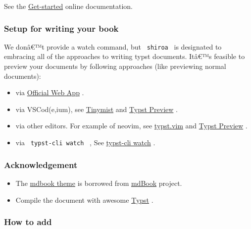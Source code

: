 See the
\href{https://myriad-dreamin.github.io/shiroa/guide/get-started.html}{Get-started}
online documentation.

\subsubsection{Setup for writing your
book}\label{setup-for-writing-your-book}

We donâ€™t provide a watch command, but \texttt{\ shiroa\ } is
designated to embracing all of the approaches to writing typst
documents. Itâ€™s feasible to preview your documents by following
approaches (like previewing normal documents):

\begin{itemize}
\item
  via \href{https://typst.app/}{Official Web App} .
\item
  via VSCod(e,ium), see
  \href{https://marketplace.visualstudio.com/items?itemName=myriad-dreamin.tinymist}{Tinymist}
  and
  \href{https://marketplace.visualstudio.com/items?itemName=mgt19937.typst-preview}{Typst
  Preview} .
\item
  via other editors. For example of neovim, see
  \href{https://github.com/kaarmu/typst.vim}{typst.vim} and
  \href{https://github.com/Enter-tainer/typst-preview\#use-without-vscode}{Typst
  Preview} .
\item
  via \texttt{\ typst-cli\ watch\ } , See
  \href{https://github.com/typst/typst\#usage}{typst-cli watch} .
\end{itemize}

\subsubsection{Acknowledgement}\label{acknowledgement}

\begin{itemize}
\item
  The
  \href{https://github.com/typst/packages/raw/main/packages/preview/shiroa/0.1.2/themes/mdbook/}{mdbook
  theme} is borrowed from
  \href{https://github.com/rust-lang/mdBook/tree/master/src/theme}{mdBook}
  project.
\item
  Compile the document with awesome
  \href{https://github.com/typst/typst}{Typst} .
\end{itemize}

\subsubsection{How to add}\label{how-to-add}

